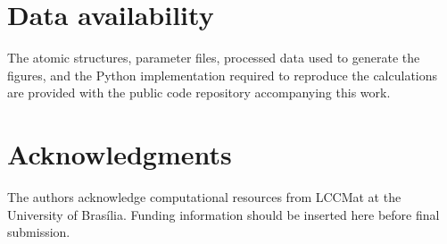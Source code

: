 \documentclass[aps,prmaterials,reprint,amsmath,amssymb,superscriptaddress,longbibliography]{revtex4-2}
\begin{document}
\section*{Data availability}
The atomic structures, parameter files, processed data used to generate the figures, and the Python implementation required to reproduce the calculations are provided with the public code repository accompanying this work.

\section*{Acknowledgments}
The authors acknowledge computational resources from LCCMat at the University of Bras\'ilia. Funding information should be inserted here before final submission.


\end{document}
